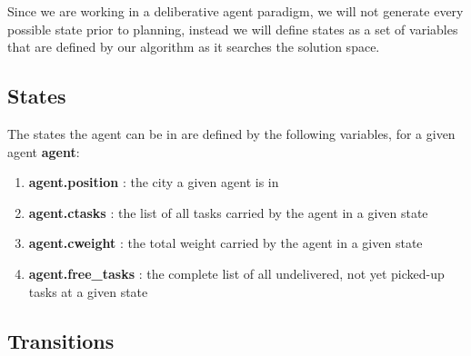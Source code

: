 \documentclass[11pt]{article}
\begin{document}
Since we are working in a deliberative agent paradigm, we will not generate every possible state prior to planning, instead we will define states as a set of variables that are defined by our algorithm as it searches the solution space.

\subsection{States}

The states the agent can be in are defined by the following variables, for a given agent \textbf{agent}:
\begin{enumerate}
    \item \textbf{agent.position} : the city a given agent is in
    \item \textbf{agent.ctasks} : the list of all tasks carried by the agent in a given state
    \item \textbf{agent.cweight} : the total weight carried by the agent in a given state
    \item \textbf{agent.free\_tasks} : the complete list of all undelivered, not yet picked-up tasks at a given state
\end{enumerate}

\subsection{Transitions}
\end{document}
